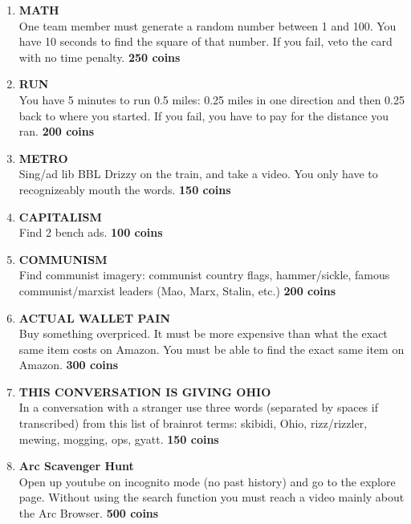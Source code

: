 \documentclass{article}
\begin{document}
\begin{enumerate}
    \item \textbf{MATH} \\ One team member must generate a random number between 1 and 100. You have 10 seconds to find the square of that number. If you fail, veto the card with no time penalty. \textbf{250 coins}
    \item \textbf{RUN}\\ You have 5 minutes to run 0.5 miles: 0.25 miles in one direction and then 0.25 back to where you started. If you fail, you have to pay for the distance you ran. \textbf{200 coins}
    \item \textbf{METRO} \\ Sing/ad lib BBL Drizzy on the train, and take a video. You only have to recognizeably mouth the words. \textbf{150 coins}
    \item \textbf{CAPITALISM} \\ Find 2 bench ads. \textbf{100 coins}
    \item \textbf{COMMUNISM} \\ Find communist imagery: communist country flags, hammer/sickle, famous communist/marxist leaders (Mao, Marx, Stalin, etc.) \textbf{200 coins}
    \item \textbf{ACTUAL WALLET PAIN} \\ Buy something overpriced. It must be more expensive than what the exact same item costs on Amazon. You must be able to find the exact same item on Amazon. \textbf{300 coins}
    \item \textbf{THIS CONVERSATION IS GIVING OHIO} \\ In a conversation with a stranger use three words (separated by spaces if transcribed) from this list of brainrot terms: skibidi, Ohio, rizz/rizzler, mewing, mogging, ops, gyatt. \textbf{150 coins}
    \item \textbf{Arc Scavenger Hunt} \\ Open up youtube on incognito mode (no past history) and go to the explore page. Without using the search function you must reach a video mainly about the Arc Browser. \textbf{500 coins}
    
\end{enumerate}
\end{document}
